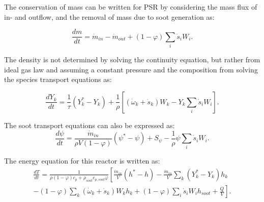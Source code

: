 The conservation of mass can be written for PSR by considering the mass flux of in- and outflow, and the removal of mass due to soot generation as:

\begin{equation}
	\frac{d m}{d t}
	=
	\dot{m}_{in} - \dot{m}_{out} 
	+ (1-\varphi) \sum_i \dot{s}_i W_i 
	\label{eqn:contpsr}.
\end{equation}

The density is not determined by solving the continuity equation, but rather from ideal gas law and assuming a constant pressure and the composition from solving the species transport equations as:

\begin{equation}
	\frac{d Y_k}{d t}
	=
	\frac{1}{\tau}
	\left( Y^*_k-Y_k \right)+
	\frac{1}{\rho}\left[\left(\dot{\omega}_k+\dot{s}_k\right) W_k-Y_k \sum_i \dot{s}_i W_i\right]
	\label{eqn:speciespsr}.
\end{equation}

The soot transport equations can also be expressed as:
\begin{equation}
	\frac{d\psi}{dt}
	=
	\frac{{\dot{m}}_{in}}{\rho V
		\left(1-\varphi\right)}
	\left(\psi^\ast-\psi\right)
	+
	S_{\psi}
	-\frac{1}{\rho}\psi\sum_{i}{{\dot{s}}_i W_i}
	\label{eqn:sootpsr}.
\end{equation}

The energy equation for this reactor is written as:
\begin{equation}
	\begin{split}
		\frac{dT}{dt}
		=
		\frac{1}
		{
			\rho\left(1-\varphi\right)c_p+\rho_{soot}c_{p,soot}\varphi
		}
		\left[
		\frac{{\dot{m}}_{in}}{V}
		\left(h^\ast-h\right)
		-
		\frac{{\dot{m}}_{in}}{V}\sum_{k}\left(Y_k^\ast-Y_k\right)h_k
		\right.\\
		\left.	
		-
		\left(1-\varphi\right)\sum_{k}{
			\left(
			{\dot{\omega}}_k
			+
			{\dot{s}}_k
			\right) W_k h_k}
		+\left(1-\varphi\right) \sum_{i}{{\dot{s}}_i W_i} h_{soot}+\frac{\dot{Q}}{V}
		\right].
	\end{split}
		\label{eqn:energypsr}
\end{equation}



